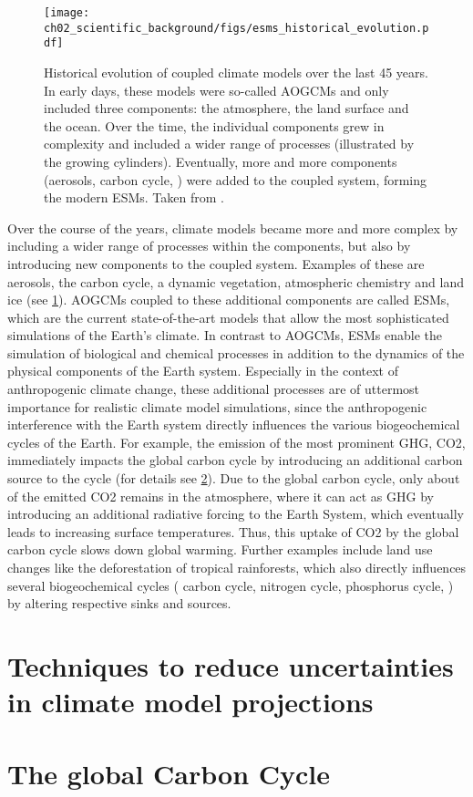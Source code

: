 \begin{figure}[t]
  \centering
  \texttt{[image: 
    ch02\_scientific\_background/figs/esms\_historical\_evolution.pdf]}
  \caption{Historical evolution of coupled climate models over the last 45
    years. In early days, these models were so-called \acfp{AOGCM} and only
    included three components: the atmosphere, the land surface and the ocean.
    Over the time, the individual components grew in complexity and included a
    wider range of processes (illustrated by the growing cylinders). Eventually,
    more and more components (aerosols, carbon cycle, \etc{}) were added to the
    coupled system, forming the modern \acfp{ESM}. Taken from
    \textcite{Cubasch2013}.}
  \label{fig:02:esms_historical_evolution}
\end{figure}

Over the course of the years, climate models became more and more complex by
including a wider range of processes within the components, but also by
introducing new components to the coupled system. Examples of these are
aerosols, the carbon cycle, a dynamic vegetation, atmospheric chemistry and
land ice (see \cref{fig:02:esms_historical_evolution}). \acp{AOGCM} coupled to
these additional components are called \acfp{ESM}, which are the current
state-of-the-art models that allow the most sophisticated simulations of the
Earth's climate. In contrast to \acp{AOGCM}, \acp{ESM} enable the simulation of
biological and chemical processes in addition to the dynamics of the physical
components of the Earth system. Especially in the context of anthropogenic
climate change, these additional processes are of uttermost importance for
realistic climate model simulations, since the anthropogenic interference with
the Earth system directly influences the various biogeochemical cycles of the
Earth. For example, the emission of the most prominent \ac{GHG}, \ac{CO2},
immediately impacts the global carbon cycle by introducing an additional carbon
source to the cycle (for details see \cref{sec:02:carbon_cycle}). Due to the
global carbon cycle, only about  of the emitted \ac{CO2} remains in the
atmosphere, where it can act as \ac{GHG} by introducing an additional radiative
forcing to the Earth System, which eventually leads to increasing surface
temperatures. Thus, this uptake of \ac{CO2} by the global carbon cycle slows
down global warming. Further examples include land use changes like the
deforestation of tropical rainforests, which also directly influences several
biogeochemical cycles (\eg{} carbon cycle, nitrogen cycle, phosphorus cycle,
\etc{}) by altering respective sinks and sources.


\section{Techniques to reduce uncertainties in climate model projections}
\label{sec:02:techniques}


\section{The global Carbon Cycle}
\label{sec:02:carbon_cycle}